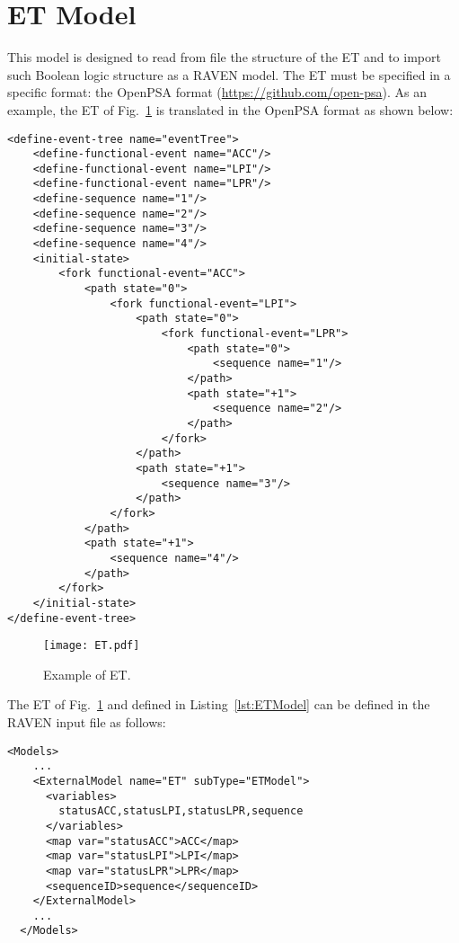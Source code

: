 \section{ET Model}
\label{sec:ETModel}

This model is designed to read from file the structure of the ET and to import such Boolean logic structure as a RAVEN model.
The ET must be specified in a specific format: the OpenPSA format (\href{<url>}{https://github.com/open-psa}). 
As an example, the ET of Fig.~\ref{fig:ET} is translated in the OpenPSA format as shown below:

\begin{lstlisting}[style=XML,morekeywords={anAttribute},caption=ET of Fig.~\ref{fig:ET} in OpenPSA format., label=lst:ETModel]
<define-event-tree name="eventTree">
    <define-functional-event name="ACC"/>
    <define-functional-event name="LPI"/>
    <define-functional-event name="LPR"/>
    <define-sequence name="1"/>
    <define-sequence name="2"/>
    <define-sequence name="3"/>
    <define-sequence name="4"/>
    <initial-state>
        <fork functional-event="ACC">
            <path state="0">
                <fork functional-event="LPI">
                    <path state="0">
                        <fork functional-event="LPR">
                            <path state="0">
                                <sequence name="1"/>
                            </path>
                            <path state="+1">
                                <sequence name="2"/>
                            </path>
                        </fork>
                    </path>
                    <path state="+1">
                        <sequence name="3"/>
                    </path>
                </fork>
            </path>
            <path state="+1">
                <sequence name="4"/>
            </path>
        </fork>
    </initial-state>
</define-event-tree>
\end{lstlisting} 

\begin{figure}
    \centering
    \centerline{\texttt{[image: ET.pdf]}} 
    \caption{Example of ET.}
    \label{fig:ET}
\end{figure}

The ET of Fig.~\ref{fig:ET} and defined in Listing~\ref{lst:ETModel} can be defined in the RAVEN input file as follows:
\begin{lstlisting}[style=XML,morekeywords={anAttribute},caption=ET model input example., label=lst:ET_InputExample]
  <Models> 
    ...
    <ExternalModel name="ET" subType="ETModel">
      <variables>
        statusACC,statusLPI,statusLPR,sequence
      </variables>
      <map var="statusACC">ACC</map>
      <map var="statusLPI">LPI</map>
      <map var="statusLPR">LPR</map>
      <sequenceID>sequence</sequenceID>
    </ExternalModel>
    ...
  </Models>
\end{lstlisting}

